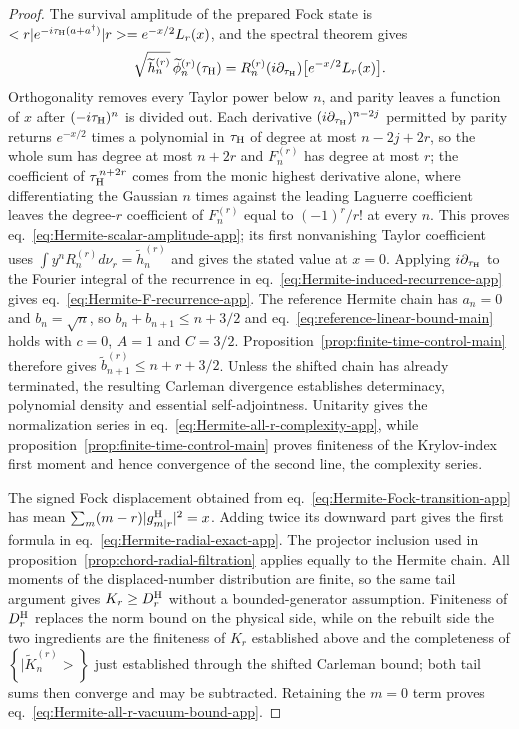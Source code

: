 \documentclass[a4paper,11pt]{article}
\def\ket#1{|#1>}%
\def\bra#1{<#1|}%
\def\dd{d}%
\def\ii{i}%
\def\ee{e}%
\theoremstyle{definition}
\theoremstyle{remark}
\newcommand{\ket}[1]{|#1\rangle}
\newcommand{\bra}[1]{\langle #1|}
\newcommand{\dd}{\mathrm d}
\newcommand{\ii}{\mathrm i}
\newcommand{\ee}{\mathrm e}
\newcommand{\tphi}{\widetilde\phi}
\newcommand{\thh}{\widetilde h}
\begin{document}
\begin{proof}
The survival amplitude of the prepared Fock state is
$\bra r\ee^{-\ii\tau_{\rm H}(a+a^\dagger)}\ket r=\ee^{-x/2}L_r(x)$, and the spectral theorem gives
\begin{equation}
   \sqrt{\thh_n^{(r)}}\,\tphi_n^{(r)}(\tau_{\rm H})
   =R_n^{(r)}(\ii\partial_{\tau_{\rm H}})
      \bigl[\ee^{-x/2}L_r(x)\bigr].
   \label{eq:Hermite-differential-amplitude-app}
\end{equation}
Orthogonality removes every Taylor power below $n$, and parity leaves a function of $x$ after
$(-\ii\tau_{\rm H})^n$ is divided out.  Each derivative $(\ii\partial_{\tau_{\rm H}})^{n-2j}$ permitted by parity returns $\ee^{-x/2}$
times a polynomial in $\tau_{\rm H}$ of degree at most $n-2j+2r$, so the whole sum has degree at
most $n+2r$ and $F_n^{(r)}$ has degree at most $r$; the coefficient of $\tau_{\rm H}^{\,n+2r}$ comes
from the monic highest derivative alone, where differentiating the Gaussian $n$ times against the
leading Laguerre coefficient leaves the degree-$r$ coefficient of $F_n^{(r)}$ equal to $(-1)^r/r!$
at every $n$.
This proves eq.~\eqref{eq:Hermite-scalar-amplitude-app}; its first nonvanishing Taylor coefficient
uses $\int y^nR_n^{(r)}\dd\nu_r=\thh_n^{(r)}$ and gives the stated value at $x=0$.
Applying $\ii\partial_{\tau_{\rm H}}$ to the Fourier integral of the recurrence in
eq.~\eqref{eq:Hermite-induced-recurrence-app} gives
eq.~\eqref{eq:Hermite-F-recurrence-app}.  
The reference Hermite chain has $a_n=0$ and $b_n=\sqrt n$, so
$b_n+b_{n+1}\le n+3/2$ and eq.~\eqref{eq:reference-linear-bound-main} holds with
$c=0$, $A=1$ and $C=3/2$. Proposition~\ref{prop:finite-time-control-main} therefore gives
$\widetilde b_{n+1}^{(r)}\le n+r+3/2$. Unless the shifted chain has already terminated, the
resulting Carleman divergence establishes determinacy, polynomial density and essential
self-adjointness.  Unitarity gives
the normalization series in
eq.~\eqref{eq:Hermite-all-r-complexity-app}, while
proposition~\ref{prop:finite-time-control-main}
proves finiteness of the Krylov-index
first moment and hence convergence of the second line, the complexity series.

The signed Fock displacement obtained from eq.~\eqref{eq:Hermite-Fock-transition-app} has mean
$\sum_m(m-r)|g_{m|r}^{\rm H}|^2=x$.  Adding twice its downward part gives the first formula in
eq.~\eqref{eq:Hermite-radial-exact-app}.  The projector inclusion used in
proposition~\ref{prop:chord-radial-filtration} applies equally to the Hermite chain.  All moments
of the displaced-number distribution are finite, so the same tail argument gives
$K_r\ge D_r^{\rm H}$ without a bounded-generator assumption.  Finiteness of $D_r^{\rm H}$ replaces the norm bound on the physical side, while on the
rebuilt side the two ingredients are the finiteness of $K_r$ established above and the
completeness of $\left\{\ket{\widetilde K_n^{(r)}}\right\}$ just established through the shifted Carleman bound;
both tail sums then converge and may be subtracted.  Retaining the $m=0$ term proves
eq.~\eqref{eq:Hermite-all-r-vacuum-bound-app}.


\end{proof}
\end{document}
